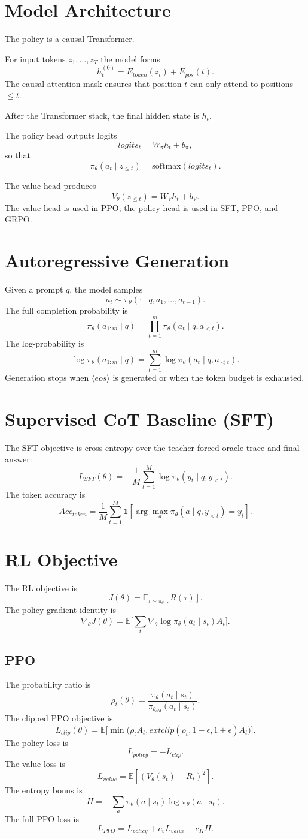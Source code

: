 \documentclass[11pt]{article}
\begin{document}
\section{Model Architecture}
The policy is a causal Transformer.

For input tokens $z_1,\dots,z_T$ the model forms
\[
 h_t^{(0)} = E_{token}(z_t) + E_{pos}(t).
\]
The causal attention mask ensures that position $t$ can only attend to positions $\le t$.

After the Transformer stack, the final hidden state is $h_t$.

The policy head outputs logits
\[
logits_t = W_\pi h_t + b_\pi,
\]
so that
\[
\pi_\theta(a_t \mid z_{\le t}) = \mathrm{softmax}(logits_t).
\]

The value head produces
\[
V_\theta(z_{\le t}) = W_V h_t + b_V.
\]
The value head is used in PPO; the policy head is used in SFT, PPO, and GRPO.

\section{Autoregressive Generation}
Given a prompt $q$, the model samples
\[
 a_t \sim \pi_\theta(\cdot \mid q,a_1,\dots,a_{t-1}).
\]
The full completion probability is
\[
\pi_\theta(a_{1:m}\mid q)=\prod_{t=1}^{m}\pi_\theta(a_t\mid q,a_{<t}).
\]
The log-probability is
\[
\log \pi_\theta(a_{1:m}\mid q)=\sum_{t=1}^{m}\log \pi_\theta(a_t\mid q,a_{<t}).
\]
Generation stops when $\langle eos \rangle$ is generated or when the token budget is exhausted.

\section{Supervised CoT Baseline (SFT)}
The SFT objective is cross-entropy over the teacher-forced oracle trace and final answer:
\[
L_{SFT}(\theta)= -\frac1M\sum_{t=1}^{M}\log \pi_\theta(y_t \mid q, y_{<t}).
\]
The token accuracy is
\[
Acc_{token} = \frac1M \sum_{t=1}^{M}\mathbf{1}[\arg\max_a \pi_\theta(a\mid q,y_{<t})=y_t].
\]

\section{RL Objective}
The RL objective is
\[
J(\theta)=\mathbb E_{\tau\sim \pi_\theta}[R(\tau)].
\]
The policy-gradient identity is
\[
\nabla_\theta J(\theta)=\mathbb E\Big[\sum_t \nabla_\theta \log \pi_\theta(a_t\mid s_t) A_t\Big].
\]

\subsection{PPO}
The probability ratio is
\[
\rho_t(\theta)=\frac{\pi_\theta(a_t\mid s_t)}{\pi_{\theta_{old}}(a_t\mid s_t)}.
\]
The clipped PPO objective is
\[
L_{clip}(\theta)=\mathbb E\Big[\min\big(\rho_t A_t,	ext{ clip}(\rho_t,1-\epsilon,1+\epsilon)A_t\big)\Big].
\]
The policy loss is
\[
L_{policy}=-L_{clip}.
\]
The value loss is
\[
L_{value}=\mathbb E[(V_\theta(s_t)-R_t)^2].
\]
The entropy bonus is
\[
H=-\sum_a \pi_\theta(a\mid s_t)\log \pi_\theta(a\mid s_t).
\]
The full PPO loss is
\[
L_{PPO}=L_{policy}+c_v L_{value}-c_H H.
\]
\end{document}
